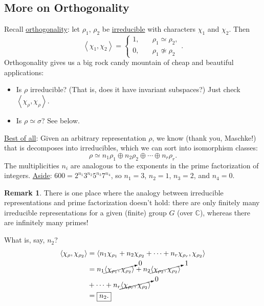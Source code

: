 \documentclass[12pt]{article}
\newcommand{\cx}{\mathbb{C}}
\newcommand{\vbrack}[1]{\left \langle #1 \right \rangle}
\theoremstyle{definition}
\newtheorem*{remark}{Remark}
\begin{document}
\subsection{More on Orthogonality}
Recall \underline{orthogonality}: let $\rho_1$, $\rho_2$ be \underline{irreducible} with characters $\chi_1$ and $\chi_2$. Then 
\begin{equation}
    \vbrack{\chi_1 , \chi_2} = 
    \begin{cases}
        1 , & \quad \rho_1 \simeq \rho_2 , \\
        0 , & \quad \rho_1 \not \simeq \rho_2
    \end{cases}.
\end{equation}
Orthogonality gives us a big rock candy mountain of cheap and beautiful applications:
\begin{itemize}
    \item Is $\rho$ irreducible? (That is, does it have invariant subspaces?) Just check $\vbrack{\chi_{\rho} , \chi_{\rho}}$.
    \item Is $\rho \simeq \sigma$? See below.
\end{itemize}
\noindent \underline{Best of all}: Given an arbitrary representation $\rho$, we know (thank you, Maschke!) that is decomposes into irreducibles, which we can sort into isomorphism classes:
\begin{equation}
    \rho \simeq n_1 \rho_1 \oplus n_2 \rho_2 \oplus \dotsb \oplus n_r \rho_r.
\end{equation}
The multiplicities $n_i$ are analogous to the exponents in the prime factorization of integers.
\newline 
\newline
\noindent \underline{Aside}: $600 = 2^{n_1} 3^{n_2} 5^{n_3} 7^{n_4}$, so $n_1 = 3$, $n_2 = 1$, $n_3 = 2$, and $n_4 = 0$.
\begin{remark}
    There is one place where the analogy between irreducible representations and prime factorization doesn't hold: there are only finitely many irreducible representations for a given (finite) group $G$ (over $\cx$), whereas there are infinitely many primes!
\end{remark}
What is, say, $n_2$?
\begin{equation}
    \begin{split}
        \vbrack{\chi_{\rho} , \chi_{\rho_2}} & = \vbrack{n_1\chi_{\rho_1} + n_2\chi_{\rho_2} + \dotsb + n_r\chi_{\rho_r}, \chi_{\rho_2}} \\
        & = n_1 \cancelto{ 0 }{ \vbrack{\chi_{\rho_1} , \chi_{\rho_2}} } + n_2 \cancelto{ 1 }{ \vbrack{\chi_{\rho_2} , \chi_{\rho_2}} } \\
        & + \dotsb + n_r \cancelto{ 0 }{ \vbrack{\chi_{\rho_r} , \chi_{\rho_2}} } \\
        & = \boxed{n_2.}
    \end{split}
\end{equation}
\end{document}
